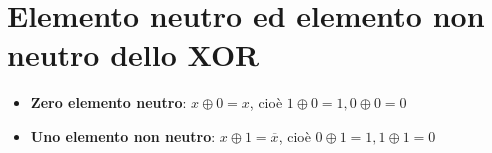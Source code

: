 \section*{Elemento neutro ed elemento non neutro dello XOR}
\small 
\begin{itemize}
	\item \textbf{Zero elemento neutro}: $x \oplus 0 = x$, cioè $1 \oplus 0 = 1, 0 \oplus 0=0$
	\item \textbf{Uno elemento non neutro}: $x\oplus 1 = \overline{x}$, cioè $0 \oplus 1 =1, 1 \oplus 1 = 0$
\end{itemize} 
\normalsize 
